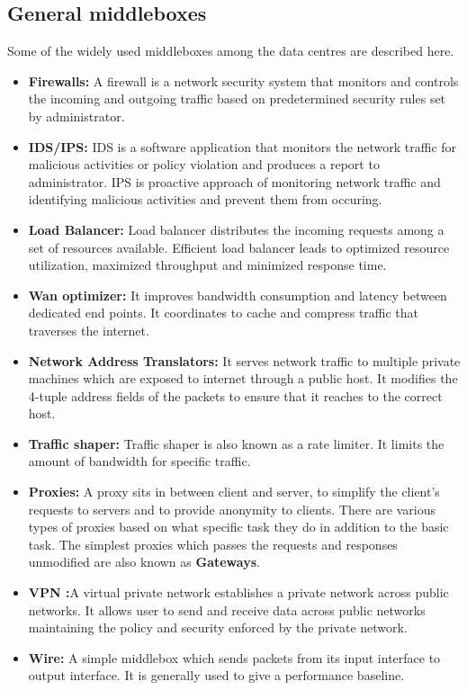 \documentclass[a4paper,11pt]{report}
\begin{document}
\subsection{General middleboxes}
Some of the widely used middleboxes among the data centres are described here.
\begin{itemize}
\item \textbf{Firewalls: }A firewall is a network security system that monitors and controls the incoming and outgoing traffic based on predetermined security rules set by administrator.~\cite{FW}
\item \textbf{IDS/IPS: }IDS is a software application that monitors the network traffic for malicious activities or policy violation and produces a report to administrator. IPS is proactive approach of monitoring network traffic and identifying malicious activities and prevent them from occuring.~\cite{IDS}
\item \textbf{Load Balancer: }Load balancer distributes the incoming requests among a set of resources available. Efficient load balancer leads to optimized resource utilization, maximized throughput and minimized response time.
\item \textbf{Wan optimizer: }It improves bandwidth consumption and latency between dedicated end points. It coordinates to cache and compress traffic that traverses the internet.~\cite{MB}
\item \textbf{Network Address Translators: }It serves network traffic to multiple private machines which are exposed to internet through a public host. It modifies the 4-tuple address fields of the packets to ensure that it reaches to the correct host.
\item \textbf{Traffic shaper: }Traffic shaper is also known as a rate limiter. It limits the amount of bandwidth for specific traffic.
\item \textbf{Proxies: }A proxy sits in between client and server, to simplify the client's requests to servers and to provide anonymity to clients. There are various types of proxies based on what specific task they do in addition to the basic task. The simplest proxies which passes the requests and responses unmodified are also known as \textbf{Gateways}.
\item \textbf{VPN :}A virtual private network establishes a private network across public networks. It allows user to send and receive data across public networks maintaining the policy and security enforced by the private network.  
\item \textbf{Wire: }A simple middlebox which sends packets from its input interface to output interface. It is generally used to give a performance baseline.            
\end{itemize}
\end{document}
